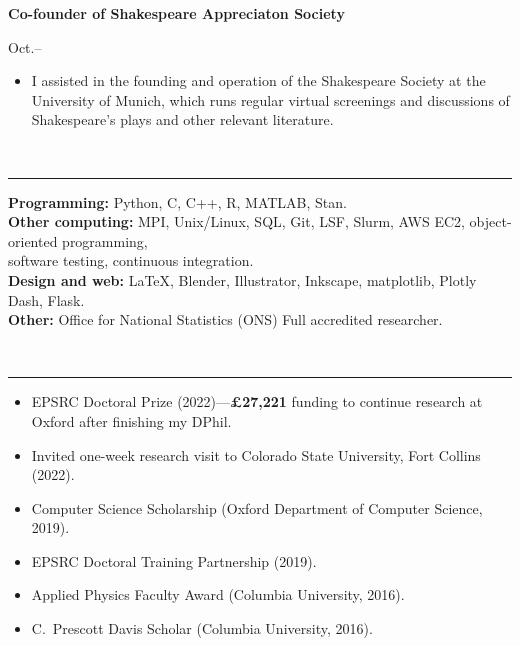 \documentclass[11pt]{article}
\begin{document}
\vspace{.2cm}

\clearpage


\noindent\parbox{.75\textwidth}{\raggedright \textbf{Co-founder of Shakespeare Appreciaton Society}}
\parbox{.25\textwidth}{ Oct.--}
\vspace{-.65cm}
\begin{itemize}
\setlength{\itemsep}{4pt}
\setlength{\parskip}{0pt}
\setlength{\parsep}{0pt}
\item I assisted in the founding and operation of the Shakespeare Society at the University of Munich, which runs regular virtual screenings and discussions of Shakespeare's plays and other relevant literature.
\end{itemize}



\vspace{0.5cm}


\vspace{-2.75mm} \\
\rule{\textwidth}{0.4pt}
\vspace{0.1mm}
\textbf{Programming:} Python, C, C++, R, MATLAB, Stan.\\
\textbf{Other computing:} MPI, Unix/Linux, SQL, Git, LSF, Slurm, AWS EC2, object-oriented programming,\\
software testing, continuous integration. \\
\textbf{Design and web:} LaTeX, Blender, Illustrator, Inkscape, matplotlib, Plotly Dash, Flask.\\
\textbf{Other:} Office for National Statistics (ONS) Full accredited researcher.

\vspace{0.5cm}




\vspace{-2.75mm} \\
\rule{\textwidth}{0.4pt}
\vspace{-.65cm}
\begin{itemize}[leftmargin=*]
\setlength{\itemsep}{4pt}
\setlength{\parskip}{0pt}
\setlength{\parsep}{0pt}
\item EPSRC Doctoral Prize (2022)---\textbf{£27,221} funding to continue research at Oxford after finishing my DPhil.
\item Invited one-week research visit to Colorado State University, Fort Collins (2022).
\item Computer Science Scholarship (Oxford Department of Computer Science, 2019).
\item EPSRC Doctoral Training Partnership (2019).
\item Applied Physics Faculty Award (Columbia University, 2016).
\item C.\ Prescott Davis Scholar (Columbia University, 2016).
\end{itemize}
\end{document}
